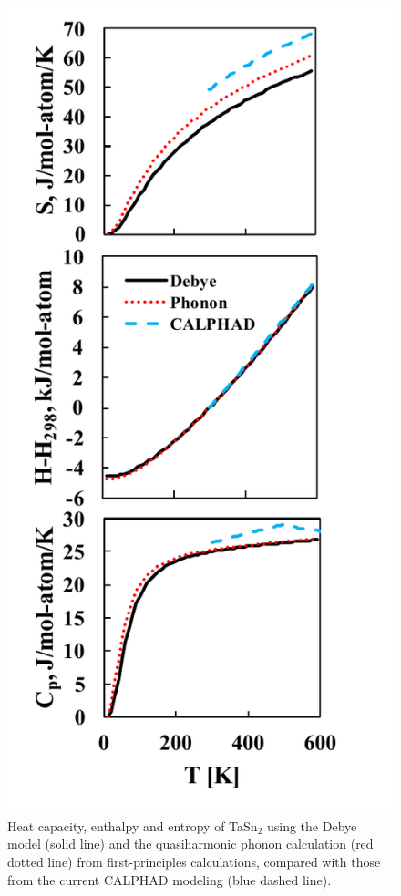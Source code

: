 \pagebreak
\begin{figure}[H]
	\centering
	\includegraphics[scale=1.0]{Chapter-4/Figures/TaSn2finitetemp.pdf}
	\caption{Heat capacity, enthalpy and entropy of TaSn$_2$ using the Debye model (solid line) and the quasiharmonic phonon calculation (red dotted line) from first-principles calculations, compared with those from the current CALPHAD modeling (blue dashed line).}
	\label{Ch4-figure:TaSn2finitetemp}
\end{figure}


